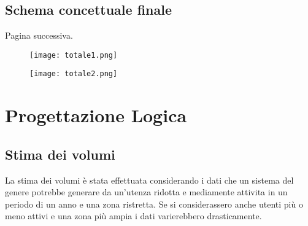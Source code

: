 \documentclass[12pt]{report}
\begin{document}
\section{Schema concettuale finale}
Pagina successiva.

    \begin{figure}[p]
        \centering
        \texttt{[image: totale1.png]}
        
    \end{figure}
    
    \begin{figure}[p]
        \centering
        \texttt{[image: totale2.png]}
    \end{figure}
    
\restoregeometry

\chapter{Progettazione Logica}

\section{Stima dei volumi}
La stima dei volumi è stata effettuata considerando i dati che un sistema del genere potrebbe generare
da un'utenza ridotta e mediamente attivita in un periodo di un anno e una zona ristretta. Se si considerassero 
anche utenti più o meno attivi e una zona più ampia i dati varierebbero drasticamente.
\end{document}
